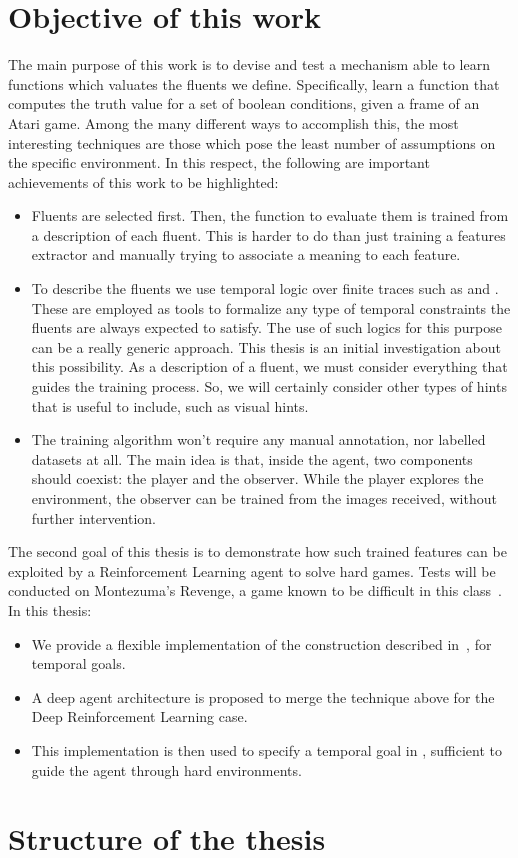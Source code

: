 \section{Objective of this work}

The main purpose of this work is to devise and test a mechanism able to learn
functions which valuates the fluents we define.  Specifically, learn a
function that computes the truth value for a set of boolean conditions, given
a frame of an Atari game. Among the many different ways to accomplish this,
the most interesting techniques are those which pose the least number of
assumptions on the specific environment. In this respect, the following are
important achievements of this work to be highlighted:
\begin{itemize}
	\item Fluents are selected first. Then, the function to evaluate them is
		trained from a description of each fluent. This is harder to do than
		just training a features extractor and manually trying to associate a
		meaning to each feature.
	\item To describe the fluents we use temporal logic over finite traces such
		as \ltl{} and \ldl{}. These are employed as tools to formalize any type of
		temporal constraints the fluents are always expected to satisfy. The use
		of such logics for this purpose can be a really generic approach. This
		thesis is an initial investigation about this possibility. As a
		description of a fluent, we must consider everything that guides the
		training process. So, we will certainly consider other types of hints that
		is useful to include, such as visual hints.
	\item The training algorithm won't require any manual annotation, nor
		labelled datasets at all. The main idea is that, inside the agent, two
		components should coexist: the player and the observer. While the player 
		explores the environment, the observer can be trained from the images
		received, without further intervention.
\end{itemize}

The second goal of this thesis is to demonstrate how such trained features can
be exploited by a Reinforcement Learning agent to solve hard games. Tests will
be conducted on Montezuma's Revenge, a game known to be difficult in this
class~\cite{bib:atari-deepq-nature}. In this thesis:
\begin{itemize}
		\item We provide a flexible implementation of the construction described
			in~\cite{bib:degiacomo-logic-nmrdp}\cite{bib:favorito-thesis}, for
			temporal goals.
		\item A deep agent architecture is proposed to merge the technique above
			for the Deep Reinforcement Learning case.
		\item This implementation is then used to specify a temporal goal in
			\ldl{}, sufficient to guide the agent through hard environments.
\end{itemize}

\section{Structure of the thesis}

